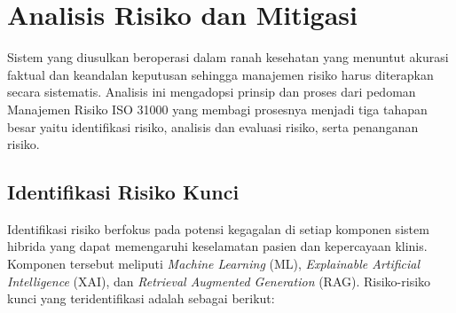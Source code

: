 \section{Analisis Risiko dan Mitigasi}
Sistem yang diusulkan beroperasi dalam ranah kesehatan yang menuntut akurasi faktual dan keandalan keputusan sehingga manajemen risiko harus diterapkan secara sistematis. Analisis ini mengadopsi prinsip dan proses dari pedoman Manajemen Risiko ISO 31000 yang membagi prosesnya menjadi tiga tahapan besar yaitu identifikasi risiko, analisis dan evaluasi risiko, serta penanganan risiko.

\subsection{Identifikasi Risiko Kunci}
Identifikasi risiko berfokus pada potensi kegagalan di setiap komponen sistem hibrida yang dapat memengaruhi keselamatan pasien dan kepercayaan klinis. Komponen tersebut meliputi \textit{Machine Learning} (ML), \textit{Explainable Artificial Intelligence} (XAI), dan \textit{Retrieval Augmented Generation} (RAG). Risiko-risiko kunci yang teridentifikasi adalah sebagai berikut:

